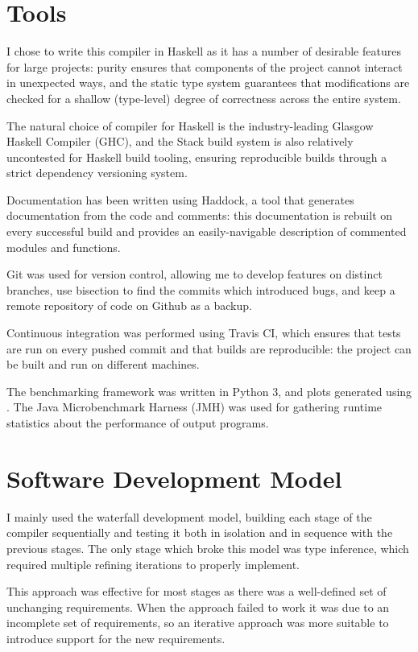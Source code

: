 \documentclass[dissertation.tex]{subfiles}
\begin{document}
\section{Tools}
{
    I chose to write this compiler in Haskell as it has a number of desirable features for large projects: purity ensures that components of the project cannot interact in unexpected ways, and the static type system guarantees that modifications are checked for a shallow (type-level) degree of correctness across the entire system.

    The natural choice of compiler for Haskell is the industry-leading Glasgow Haskell Compiler (GHC), and the Stack build system is also relatively uncontested for Haskell build tooling, ensuring reproducible builds through a strict dependency versioning system.

    Documentation has been written using Haddock, a tool that generates documentation from the code and comments: this documentation is rebuilt on every successful build and provides an easily-navigable description of commented modules and functions.

    Git was used for version control, allowing me to develop features on distinct branches, use bisection to find the commits which introduced bugs, and keep a remote repository of code on Github as a backup. 

    Continuous integration was performed using Travis CI, which ensures that tests are run on every pushed commit and that builds are reproducible: the project can be built and run on different machines.

    The benchmarking framework was written in Python 3, and plots generated using . The Java Microbenchmark Harness (JMH) was used for gathering runtime statistics about the performance of output programs. 
}
\section{Software Development Model}\label{sec:software-development-model}
{
    I mainly used the waterfall development model, building each stage of the compiler sequentially and testing it both in isolation and in sequence with the previous stages. The only stage which broke this model was type inference, which required multiple refining iterations to properly implement.

    This approach was effective for most stages as there was a well-defined set of unchanging requirements. When the approach failed to work it was due to an incomplete set of requirements, so an iterative approach was more suitable to introduce support for the new requirements.
}
\end{document}
